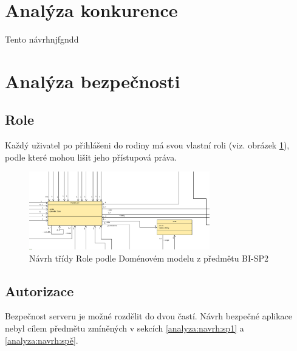     \section{Analýza konkurence}
        Tento návrhnjfgndd

    \section{Analýza bezpečnosti}
    
        \subsection{Role}\label{analyza:bezpecnost:role}
    
        Každý uživatel po přihlášeni do rodiny má svou vlastní roli (viz. obrázek \ref{image:Role1}), podle které mohou lišit jeho přístupová práva. 
        \begin{figure}\centering
	        \includegraphics[width=0.7\textwidth]{pdfs/Role1}
	        \caption[Návrh Rolí]{Návrh třídy Role podle Doménovém modelu z předmětu BI-SP2}\label{image:Role1}
        \end{figure}
    
        \subsection{Autorizace}
            Bezpečnost serveru je možné rozdělit do dvou častí. 
            Návrh bezpečné aplikace nebyl cílem předmětu zmíněných v sekcích \ref{analyza:navrh:sp1} a \ref{analyza:navrh:spě}.